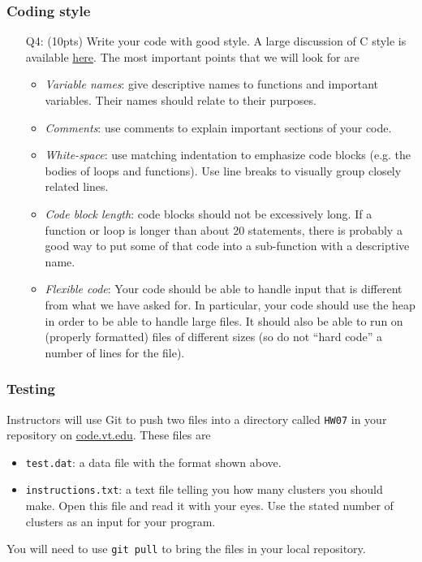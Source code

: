 \subsubsection*{Coding style}

\begin{itemize}
    \item[Q4:] (10pts) Write your code with good style.
    A large discussion of C style is available \href{https://users.ece.cmu.edu/~eno/coding/CCodingStandard.html}{here}.
    The most important points that we will look for are
    \begin{itemize}
        \item \emph{Variable names}:
        give descriptive names to functions and important variables.
        Their names should relate to their purposes.
        \item \emph{Comments}:
        use comments to explain important sections of your code.
        \item \emph{White-space}:
        use matching indentation to emphasize code blocks (e.g. the bodies of loops and functions).
        Use line breaks to visually group closely related lines.
        \item \emph{Code block length}:
        code blocks should not be excessively long.
        If a function or loop is longer than about 20 statements,
        there is probably a good way to put some of that code into a sub-function with a descriptive name.
        \item \emph{Flexible code}:
        Your code should be able to handle input that is different from what we have asked for.
        In particular, your code should use the heap in order to be able to handle large files.
        It should also be able to run on (properly formatted) files of different sizes (so do not ``hard code'' a number of lines for the file).
    \end{itemize}
\end{itemize}

\subsubsection*{Testing}

Instructors will use Git to push two files into a directory called \texttt{HW07} in your repository on \href{http://code.vt.edu}{code.vt.edu}.
These files are
\begin{itemize}
    \item  \texttt{test.dat}: a data file with the format shown above.
    \item \texttt{instructions.txt}: a text file telling you how many clusters you should make.
    Open this file and read it with your eyes.
    Use the stated number of clusters as an input for your program.
\end{itemize}
You will need to use \texttt{git pull} to bring the files in your local repository.


